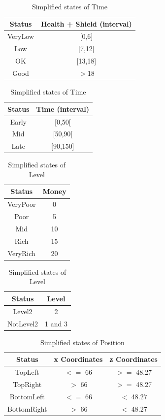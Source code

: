 \documentclass{article}
\begin{document}
  \begin{table}[h!]
    \parbox{.45\linewidth}{
      \centering
      \caption{Simplified states of Health}
      \label{tab:healthStates2}
      \begin{tabular}{c|c}
        \textbf{Status} & \textbf{Health + Shield (interval)}\\
        \hline
        VeryLow & [0,6]\\
        Low & [7,12]\\
        OK & [13,18]\\
        Good & $>$18\\
      \end{tabular}
    }
    \hfil
    \parbox{.45\linewidth}{
      \centering
      \caption{Simplified states of Time}
      \label{tab:timeStates2}
      \begin{tabular}{c|c}
        \textbf{Status} & \textbf{Time (interval)}\\
        \hline
        Early  & [0,50[\\
        Mid & [50,90[\\
        Late & [90,150]\\
      \end{tabular}
    }
  \end{table}
  \begin{table}[h!]
    \parbox{.45\linewidth}{
      \centering
      \caption{Simplified states of Money}
      \label{tab:moneyStates3}
      \begin{tabular}{c|c}
        \textbf{Status} & \textbf{Money}\\
        \hline
        VeryPoor & 0\\
        Poor & 5\\
        Mid & 10\\
        Rich &  15\\
        VeryRich & 20\\
      \end{tabular}
    }
    \hfil
    \parbox{.45\linewidth}{
      \centering
      \caption{Simplified states of Level}
      \label{tab:levelStates2}
      \begin{tabular}{c|c}
        \textbf{Status} & \textbf{Level}\\
        \hline
        Level2 & 2\\
        NotLevel2 & 1 and 3\\
      \end{tabular}
    }
  \end{table}
  \begin{table}[h!]
    \centering
    \caption{Simplified states of Position}
    \label{tab:positionStates2}
    \begin{tabular}{c|c|c}
      \textbf{Status} & \textbf{x Coordinates} & \textbf{z Coordinates}\\
      \hline
      TopLeft & $<=$ 66 & $>=$ 48.27\\
      TopRight & $>$ 66 & $>=$ 48.27\\
      BottomLeft & $<=$ 66 & $<$ 48.27\\
      BottomRight & $>$ 66 & $<$ 48.27\\
    \end{tabular}
  \end{table}
\end{document}
